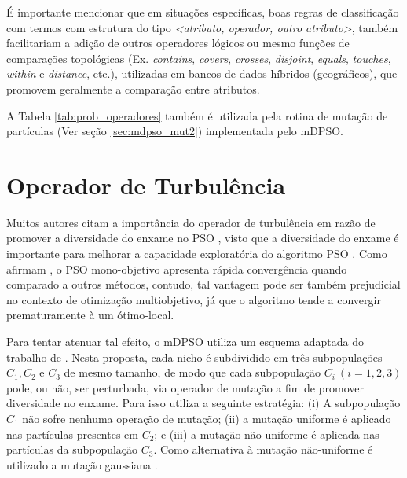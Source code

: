 \documentclass[
	12pt,				%
	openany,			%
	oneside,	
	a4paper,			%
	brazil,				%
	]{unimontes-ppgmsc-abntex2}
\begin{document}
É importante mencionar que em situações específicas, boas regras de classificação com termos com estrutura do tipo \textit{<atributo, operador, outro atributo>}, também facilitariam a adição de outros operadores lógicos ou mesmo funções de comparações topológicas (Ex. {\em contains}, {\em covers}, {\em crosses}, {\em disjoint}, {\em equals}, {\em touches}, {\em within} e {\em distance}, etc.), utilizadas em bancos de dados híbridos (geográficos), que promovem geralmente a comparação entre atributos.

\begin{table}[ht] %
\setlength{\arrayrulewidth}{.2em}
\vspace{12pt}
\centering{}
\caption{Probabilidade de seleção dos operadores relacionais usada pelas rotinas de geração de partículas e de mutação do mDPSO.}
\label{tab:prob_operadores}
\end{table}

A Tabela \ref{tab:prob_operadores} também é utilizada pela rotina de mutação de partículas (Ver seção \ref{sec:mdpso_mut2}) implementada pelo mDPSO.

\section{Operador de Turbulência}
\label{sec:mdpso_oper_turb}

Muitos autores citam a importância do operador de turbulência em razão de promover a diversidade do enxame no PSO \cite{Parsopoulos_2008}, visto que a diversidade do enxame é importante para melhorar a capacidade exploratória do algoritmo PSO \cite{Reyes_2006}. Como afirmam , o PSO mono-objetivo apresenta rápida convergência quando comparado a outros métodos, contudo, tal vantagem pode ser também prejudicial no contexto de otimização multiobjetivo, já que o algoritmo tende a convergir prematuramente à um ótimo-local.

Para tentar atenuar tal efeito, o mDPSO utiliza um esquema adaptada do trabalho de  . Nesta proposta, cada nicho é subdividido em três subpopulações $C_1, C_2$ e $C_3$ de mesmo tamanho, de modo que cada subpopulação $C_i \ (i=1,2,3)$ pode, ou não, ser perturbada, via operador de mutação a fim de promover diversidade no enxame. Para isso utiliza a seguinte estratégia: (i) A subpopulação $C_1$ não sofre nenhuma operação de mutação; (ii) a mutação uniforme é aplicado nas partículas presentes em $C_2$; e (iii) a mutação não-uniforme é aplicada nas partículas da subpopulação $C_3$. Como alternativa à mutação não-uniforme é utilizado a mutação gaussiana \cite{Higashi_2003}. 
\end{document}
